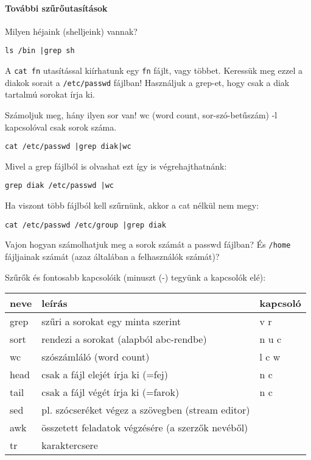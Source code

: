 \documentclass[a4paper]{article}
\newcommand{\code}{\texttt}
\begin{document}
\paragraph{További szűrőutasítások}

Milyen héjaink (shelljeink) vannak?
\begin{Verbatim}
ls /bin |grep sh
\end{Verbatim}

A \code{cat fn} utasítással kiírhatunk egy \code{fn} fájlt, vagy többet. Keressük meg ezzel
a diakok sorait a \code{/etc/passwd} fájlban! Használjuk a grep-et, hogy csak a
diak tartalmú sorokat írja ki.

Számoljuk meg, hány ilyen sor van! wc (word count, sor-szó-betűszám) -l
kapcsolóval csak sorok száma.
\begin{Verbatim}
cat /etc/passwd |grep diak|wc
\end{Verbatim}

Mivel a grep fájlból is olvashat ezt így is végrehajthatnánk:
\begin{Verbatim}
grep diak /etc/passwd |wc
\end{Verbatim}
Ha viszont több fájlból kell szűrnünk, akkor a cat nélkül nem megy:
\begin{Verbatim}
cat /etc/passwd /etc/group |grep diak
\end{Verbatim}


Vajon hogyan számolhatjuk meg a sorok számát a passwd fájlban? És
\code{/home} fájljainak számát (azaz általában a felhasználók számát)?

Szűrők és fontosabb kapcsolóik (minuszt (-) tegyünk a kapcsolók elé):\\
\begin{tabular}{|l|l|l|}
\hline
neve& leírás & kapcsoló\\
\hline
grep & szűri a sorokat egy minta szerint&v r\\
\hline
sort &rendezi a sorokat (alapból abc-rendbe)&n u c\\
\hline
wc & szószámláló (word count)&l c w\\
\hline
head & csak a fájl elejét írja ki (=fej)&n c\\
\hline
tail & csak a fájl végét írja ki (=farok)&n c\\
\hline
sed & pl. szócseréket végez a szövegben (stream editor)&\\
\hline
awk & összetett feladatok végzésére (a szerzők nevéből)&\\
\hline
tr & karaktercsere&\\
\hline
\end{tabular}
\end{document}
